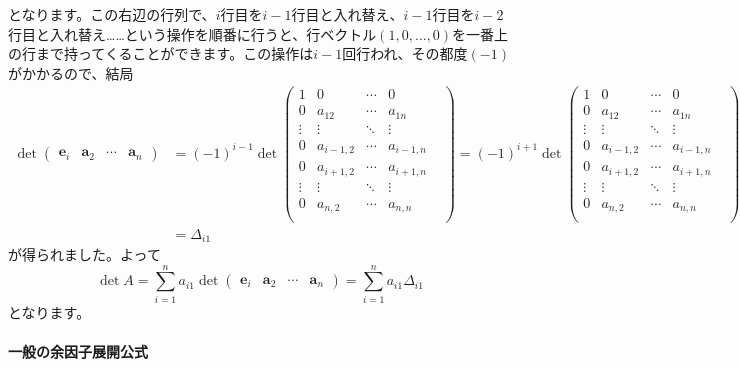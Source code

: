 となります。この右辺の行列で、$i$行目を$i - 1$行目と入れ替え、$i - 1$行目を$i - 2$行目と入れ替え……という操作を順番に行うと、行ベクトル$(1, 0, \ldots, 0)$を一番上の行まで持ってくることができます。この操作は$i - 1$回行われ、その都度$(-1)$がかかるので、結局
\begin{align*}
\det \begin{pmatrix}
\bm{e}_i & \bm{a}_{2} & \cdots & \bm{a}_n
\end{pmatrix}
&= (-1)^{i - 1}
\det \begin{pmatrix}
1 & 0 & \cdots & 0 \\
0 & a_{12} & \cdots & a_{1n} \\
\vdots & \vdots & \ddots & \vdots &  \\
0 & a_{i - 1, 2} & \cdots & a_{i - 1, n} \\
0 & a_{i + 1, 2} & \cdots & a_{i + 1, n} \\
\vdots & \vdots & \ddots & \vdots \\
0 & a_{n, 2} & \cdots & a_{n, n} \\
\end{pmatrix}
= (-1)^{i + 1}
\det \begin{pmatrix}
1 & 0 & \cdots & 0 \\
0 & a_{12} & \cdots & a_{1n} \\
\vdots & \vdots & \ddots & \vdots &  \\
0 & a_{i - 1, 2} & \cdots & a_{i - 1, n} \\
0 & a_{i + 1, 2} & \cdots & a_{i + 1, n} \\
\vdots & \vdots & \ddots & \vdots \\
0 & a_{n, 2} & \cdots & a_{n, n} \\
\end{pmatrix} \\
&= \Delta_{i1}
\end{align*}
が得られました。よって
\[
\det A = 
\sum_{i = 1}^n a_{i1} \det 
\begin{pmatrix}
\bm{e}_i & \bm{a}_{2} & \cdots & \bm{a}_n
\end{pmatrix}
= 
\sum_{i = 1}^n a_{i1} \Delta_{i1}
\]
となります。

\paragraph{一般の余因子展開公式}

